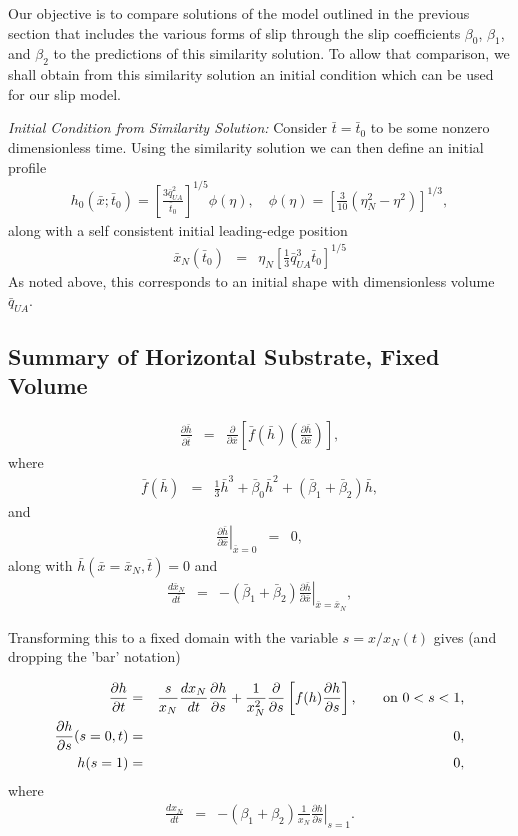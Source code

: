 \documentclass[11pt]{article}
\newcommand{\bea}{\begin{eqnarray}}
\newcommand{\eea}{\end{eqnarray}}
\begin{document}
Our objective is to compare solutions of the model outlined in the previous section that includes the various forms of slip 
through the slip coefficients $\beta_0$, $\beta_1$, and $\beta_2$ to the predictions of this similarity 
solution.   To allow that comparison, we shall obtain from this similarity solution an initial condition which can be used 
for our slip model.  

{\it Initial Condition from Similarity Solution:}  Consider $\bar{t} = \bar{t}_0$ to be some nonzero dimensionless time.  Using the
similarity solution we can then define an initial profile
\bea
h_0(\bar{x}; \bar{t}_0) =  \left[ \frac{ 3 \bar{q}_{UA}^{2} }{\bar{t}_0 } \right]^{1/5} \phi(\eta), \quad
\phi(\eta)  =  \left[ \frac{3}{10} \left( \eta_N^2 - \eta^2 \right) \right]^{1/3},
\eea
along with a self consistent initial leading-edge position
\bea
\bar{x}_N(\bar{t}_0) & = & \eta_N \left[ \frac{1}{3} \bar{q}_{UA}^{3} \bar{t}_0 \right]^{1/5}
\eea
As noted above, this corresponds to an initial shape with dimensionless volume $\bar{q}_{UA}$.


\subsection{Summary of Horizontal Substrate, Fixed Volume}

\bea
\frac{\partial \bar{h}}{\partial \bar{t}} & = & \frac{\partial}{\partial \bar{x}} \left[ \bar{f}(\bar{h}) \left( \frac{\partial \bar{h}}{\partial \bar{x}} \right) \right],
\eea
where
\bea
\bar{f}(\bar{h}) & = & \frac{1}{3} \bar{h}^3 + \bar{\beta}_0 \bar{h}^2 + ( \bar{\beta}_1 + \bar{\beta}_2 ) \bar{h},
\eea
and
\bea
\left. \frac{\partial \bar{h}}{\partial \bar{x}} \right|_{\bar{x}=0} & = & 0,
\eea
along with $\bar{h}(\bar{x}=\bar{x}_N,\bar{t}) = 0$ and
\bea
\frac{d\bar{x}_N}{d\bar{t}} & = & - ( \bar{\beta}_1 + \bar{\beta}_2 ) \left. \frac{\partial \bar{h}}{\partial \bar{x}} \right|_{\bar{x}=\bar{x}_N},
\eea

Transforming this to a fixed domain with the variable $s = x/x_N(t)$ gives (and dropping the 'bar' notation)

\bea
\label{eq:h_fixed_domain}
\frac{\partial h}{\partial t} & = & \frac{s}{x_N} \frac{dx_N}{dt} \frac{\partial h}{\partial s} + \frac{1}{x_N^2} \frac{\partial}{\partial s} \left[ f(h)\frac{\partial h}{\partial s} \right], \hspace{0.25in} \mbox{on $0 < s < 1$},\\
\label{eq:bc1_fixed_domain}
\frac{\partial h}{\partial s}(s=0,t) & = & 0,\\
\label{eq:bc2_fixed_domain}
h(s=1) & = & 0,
\eea
where
\bea
\label{eq:bc3_fixed_domain}
\frac{dx_N}{dt} & = &  - ( \beta_1 + \beta_2 ) \frac{1}{x_N} \left. \frac{\partial h}{\partial s} \right|_{s=1}.
\eea
\end{document}
